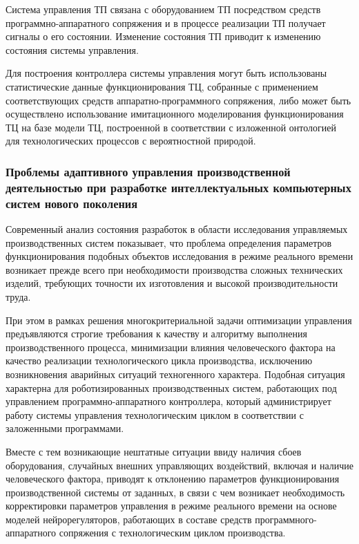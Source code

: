 Система управления ТП связана с оборудованием ТП посредством средств программно-аппаратного сопряжения и в процессе реализации ТП получает сигналы о его состоянии. Изменение состояния ТП приводит к изменению состояния системы управления.

Для построения контроллера системы управления могут быть использованы статистические данные функционирования ТЦ, собранные с применением соответствующих средств аппаратно-программного сопряжения, либо может быть осуществлено использование имитационного моделирования функционирования ТЦ на базе модели ТЦ, построенной в соответствии с изложенной онтологией для технологических процессов с вероятностной природой.



\subsubsection{Проблемы адаптивного управления производственной деятельностью при разработке интеллектуальных компьютерных систем нового поколения}

Современный анализ состояния разработок в области исследования управляемых производственных систем показывает, что проблема определения параметров функционирования подобных объектов исследования в режиме реального времени возникает прежде всего при необходимости производства сложных технических изделий, требующих точности их изготовления и высокой производительности труда.

При этом в рамках решения многокритериальной задачи оптимизации управления предъявляются строгие требования к качеству и алгоритму выполнения производственного процесса, минимизации влияния человеческого фактора на качество реализации технологического цикла производства, исключению возникновения аварийных ситуаций техногенного характера. Подобная ситуация характерна для роботизированных производственных систем, работающих под управлением программно-аппаратного контроллера, который администрирует работу системы управления технологическим циклом в соответствии с заложенными программами.

Вместе с тем возникающие нештатные ситуации ввиду наличия сбоев оборудования, случайных внешних управляющих воздействий, включая и наличие человеческого фактора, приводят к отклонению параметров функционирования производственной системы от заданных, в связи с чем возникает необходимость корректировки параметров управления в режиме реального времени на основе моделей нейрорегуляторов, работающих в составе средств программного-аппаратного сопряжения с технологическим циклом производства.

